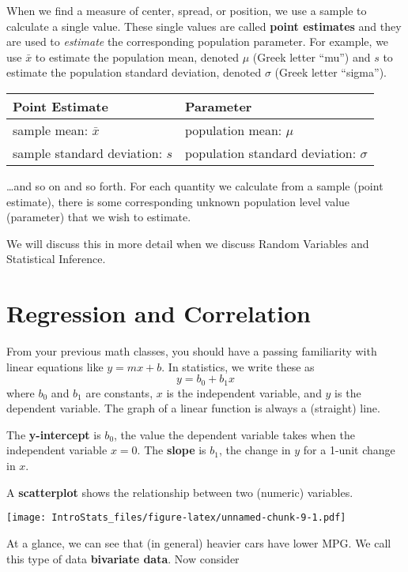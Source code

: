 \documentclass[
]{book}
\begin{document}
When we find a measure of center, spread, or position, we use a sample to calculate a single value. These single values are called \textbf{point estimates} and they are used to \emph{estimate} the corresponding population parameter. For example, we use \(\bar{x}\) to estimate the population mean, denoted \(\mu\) (Greek letter ``mu'') and \(s\) to estimate the population standard deviation, denoted \(\sigma\) (Greek letter ``sigma'').

\begin{longtable}[]{@{}ll@{}}
\toprule
Point Estimate & Parameter \\
\midrule
\endhead
sample mean: \(\bar{x}\) & population mean: \(\mu\) \\
sample standard deviation: \(s\) & population standard deviation: \(\sigma\) \\
\bottomrule
\end{longtable}

\ldots and so on and so forth. For each quantity we calculate from a sample (point estimate), there is some corresponding unknown population level value (parameter) that we wish to estimate.

We will discuss this in more detail when we discuss Random Variables and Statistical Inference.

\hypertarget{regression-and-correlation}{%
\section{Regression and Correlation}\label{regression-and-correlation}}

From your previous math classes, you should have a passing familiarity with linear equations like \(y=mx+b\). In statistics, we write these as \[y=b_0 + b_1x\] where \(b_0\) and \(b_1\) are constants, \(x\) is the independent variable, and \(y\) is the dependent variable. The graph of a linear function is always a (straight) line.

The \textbf{y-intercept} is \(b_0\), the value the dependent variable takes when the independent variable \(x=0\). The \textbf{slope} is \(b_1\), the change in \(y\) for a 1-unit change in \(x\).

A \textbf{scatterplot} shows the relationship between two (numeric) variables.

\texttt{[image: IntroStats\_files/figure-latex/unnamed-chunk-9-1.pdf]}

At a glance, we can see that (in general) heavier cars have lower MPG. We call this type of data \textbf{bivariate data}. Now consider
\end{document}
